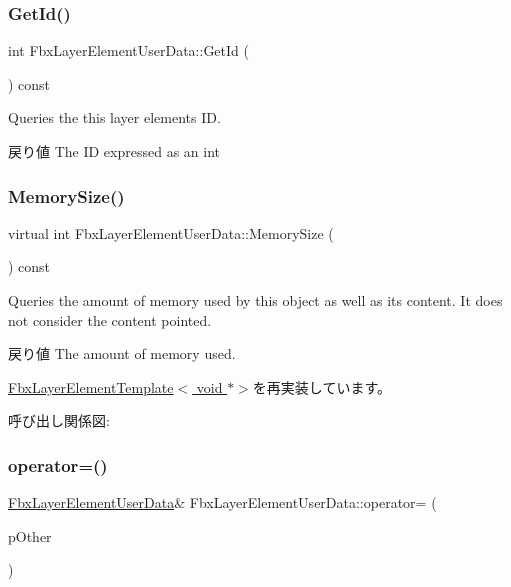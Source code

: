 \subsubsection{\texorpdfstring{Get\+Id()}{GetId()}}
{\footnotesize\ttfamily int Fbx\+Layer\+Element\+User\+Data\+::\+Get\+Id (\begin{DoxyParamCaption}{ }\end{DoxyParamCaption}) const}

Queries the this layer element\textquotesingle{}s ID. \begin{DoxyReturn}{戻り値}
The ID expressed as an int 
\end{DoxyReturn}
\mbox{\label{class_fbx_layer_element_user_data_aa02fc5861dec4da68293f9660d4ff13b}} 
\subsubsection{\texorpdfstring{Memory\+Size()}{MemorySize()}}
{\footnotesize\ttfamily virtual int Fbx\+Layer\+Element\+User\+Data\+::\+Memory\+Size (\begin{DoxyParamCaption}{ }\end{DoxyParamCaption}) const\hspace{0.3cm}{\ttfamily [virtual]}}

Queries the amount of memory used by this object as well as its content. It does not consider the content pointed. \begin{DoxyReturn}{戻り値}
The amount of memory used. 
\end{DoxyReturn}


\hyperlink{class_fbx_layer_element_template_aa6a7b5ed38b51d4a903f9ed2e715ee79}{Fbx\+Layer\+Element\+Template$<$ void $\ast$$>$}を再実装しています。

呼び出し関係図\+:
\mbox{\label{class_fbx_layer_element_user_data_ae4e7b6fca22ea7dc404251bfea061e8d}} 
\subsubsection{\texorpdfstring{operator=()}{operator=()}}
{\footnotesize\ttfamily \hyperlink{class_fbx_layer_element_user_data}{Fbx\+Layer\+Element\+User\+Data}\& Fbx\+Layer\+Element\+User\+Data\+::operator= (\begin{DoxyParamCaption}\item[{\hyperlink{class_fbx_layer_element_user_data}{Fbx\+Layer\+Element\+User\+Data} const \&}]{p\+Other }\end{DoxyParamCaption})}

